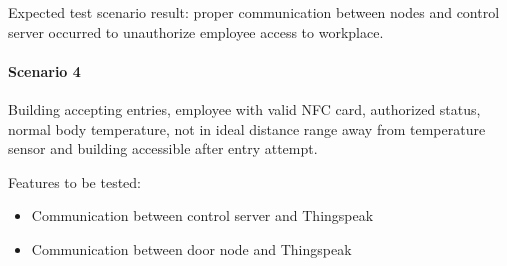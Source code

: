 \noindent
Expected test scenario result: proper communication between nodes and control
server occurred to unauthorize employee access to workplace.

\paragraph{Scenario 4}
Building accepting entries, employee with valid NFC card, authorized status,
normal body temperature, not in ideal distance range away from temperature
sensor and building accessible after entry attempt.

\noindent
Features to be tested:
\begin{itemize}
    \item Communication between control server and Thingspeak
    \item Communication between door node and Thingspeak
\end{itemize}


